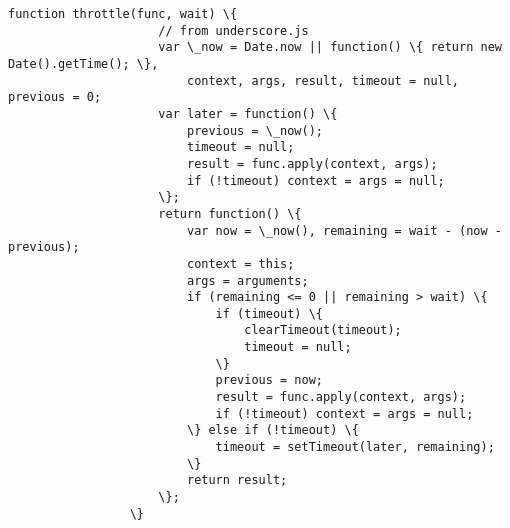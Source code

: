 \documentclass[11pt]{article}
\begin{document}
\begin{Verbatim}[commandchars=\\\{\}]
                 function throttle(func, wait) \{
                     // from underscore.js
                     var \_now = Date.now || function() \{ return new Date().getTime(); \},
                         context, args, result, timeout = null, previous = 0;
                     var later = function() \{
                         previous = \_now();
                         timeout = null;
                         result = func.apply(context, args);
                         if (!timeout) context = args = null;
                     \};
                     return function() \{
                         var now = \_now(), remaining = wait - (now - previous);
                         context = this;
                         args = arguments;
                         if (remaining <= 0 || remaining > wait) \{
                             if (timeout) \{
                                 clearTimeout(timeout);
                                 timeout = null;
                             \}
                             previous = now;
                             result = func.apply(context, args);
                             if (!timeout) context = args = null;
                         \} else if (!timeout) \{
                             timeout = setTimeout(later, remaining);
                         \}
                         return result;
                     \};
                 \}
         

\end{Verbatim}
\end{document}
